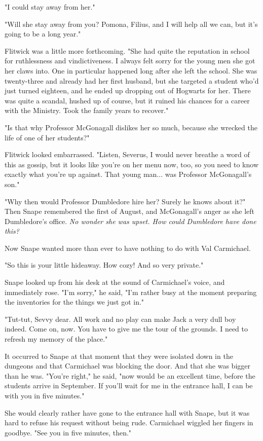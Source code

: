 \documentclass[a4paper,11pt]{article}
\begin{document}
"I could stay away from her."

"Will she stay away from you? Pomona, Filius, and I will help all we can, but it's going to be a long year."

Flitwick was a little more forthcoming. "She had quite the reputation in school for ruthlessness and vindictiveness. I always felt sorry for the young men she got her claws into. One in particular happened long after she left the school. She was twenty-three and already had her first husband, but she targeted a student who'd just turned eighteen, and he ended up dropping out of Hogwarts for her. There was quite a scandal, hushed up of course, but it ruined his chances for a career with the Ministry. Took the family years to recover."

"Is that why Professor McGonagall dislikes her so much, because she wrecked the life of one of her students?"

Flitwick looked embarrassed. "Listen, Severus, I would never breathe a word of this as gossip, but it looks like you're on her menu now, too, so you need to know exactly what you're up against. That young man... was Professor McGonagall's son."

"Why then would Professor Dumbledore hire her? Surely he knows about it?" Then Snape remembered the first of August, and McGonagall's anger as she left Dumbledore's office. \emph{No wonder she was upset. How could Dumbledore have done this?}

Now Snape wanted more than ever to have nothing to do with Val Carmichael.

"So this is your little hideaway. How cozy! And so very private."

Snape looked up from his desk at the sound of Carmichael's voice, and immediately rose. "I'm sorry," he said, "I'm rather busy at the moment preparing the inventories for the things we just got in."

"Tut-tut, Sevvy dear. All work and no play can make Jack a very dull boy indeed. Come on, now. You have to give me the tour of the grounds. I need to refresh my memory of the place."

It occurred to Snape at that moment that they were isolated down in the dungeons and that Carmichael was blocking the door. And that she was bigger than he was. "You're right," he said, "now would be an excellent time, before the students arrive in September. If you'll wait for me in the entrance hall, I can be with you in five minutes."

She would clearly rather have gone to the entrance hall with Snape, but it was hard to refuse his request without being rude. Carmichael wiggled her fingers in goodbye. "See you in five minutes, then."
\end{document}

